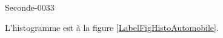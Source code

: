 
\begin{corrige}{Seconde-0033}

L'histogramme est à la figure \ref{LabelFigHistoAutomobile}.
\newcommand{\CaptionFigHistoAutomobile}{L'histogramme de l'exercice \ref{exoSeconde-0033}.}


\end{corrige}
